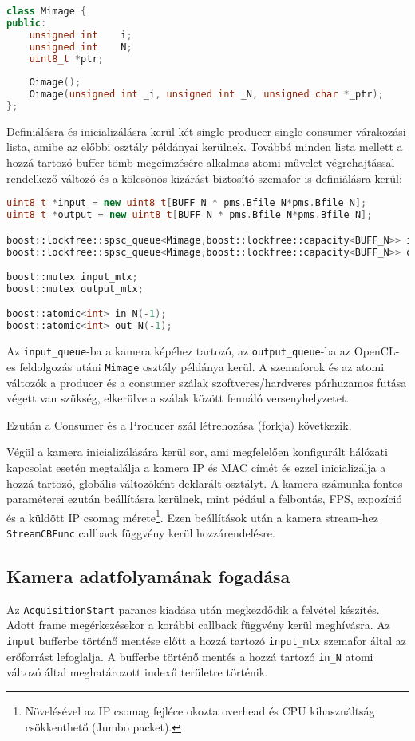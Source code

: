 \begin{lstlisting}[language=C++]
class Mimage {
public:
	unsigned int	i;
	unsigned int	N;
	uint8_t	*ptr;
	
	Oimage();
	Oimage(unsigned int _i, unsigned int _N, unsigned char *_ptr);
};
\end{lstlisting}

\noindent Definiálásra és inicializálásra kerül két single-producer single-consumer várakozási lista, amibe az előbbi osztály
példányai kerülnek. Továbbá minden lista mellett a hozzá tartozó buffer tömb megcímzésére alkalmas atomi művelet végrehajtással
rendelkező változó és a kölcsönös kizárást biztosító szemafor is definiálásra kerül:

\begin{lstlisting}[language=C++]
uint8_t *input = new uint8_t[BUFF_N * pms.Bfile_N*pms.Bfile_N];
uint8_t *output = new uint8_t[BUFF_N * pms.Bfile_N*pms.Bfile_N];

boost::lockfree::spsc_queue<Mimage,boost::lockfree::capacity<BUFF_N>> input_queue;
boost::lockfree::spsc_queue<Mimage,boost::lockfree::capacity<BUFF_N>> output_queue;

boost::mutex input_mtx;
boost::mutex output_mtx;

boost::atomic<int> in_N(-1);
boost::atomic<int> out_N(-1);
\end{lstlisting}

\noindent Az \texttt{input\_queue}-ba a kamera képéhez tartozó, az \texttt{output\_queue}-ba az OpenCL-es feldolgozás utáni
	\texttt{Mimage} osztály példánya kerül. A szemaforok és az atomi változók a producer és a consumer szálak szoftveres/hardveres
	párhuzamos futása végett van szükség, elkerülve a szálak között fennáló versenyhelyzetet.

	Ezután a Consumer és a Producer szál létrehozása (forkja) következik.
	
	Végül a kamera inicializálására kerül sor, ami megfelelően konfigurált hálózati kapcsolat esetén megtalálja a kamera IP és MAC
	címét és ezzel inicializálja a hozzá tartozó, globális változóként deklarált osztályt. A kamera számunka fontos paraméterei ezután
	beállításra kerülnek, mint pédául a felbontás, FPS, expozíció és a küldött IP csomag mérete\footnote{Növelésével az IP csomag
	fejléce okozta overhead és CPU kihasználtság csökkenthető (Jumbo packet).}.
	Ezen beállítások után a kamera stream-hez \texttt{StreamCBFunc} callback függvény kerül hozzárendelésre. 
	 
	\subsection*{Kamera adatfolyamának fogadása}
	Az \texttt{AcquisitionStart} parancs kiadása után megkezdődik a felvétel készítés. Adott frame megérkezésekor a korábbi callback
	függvény kerül meghívásra. Az \texttt{input} bufferbe történő mentése előtt a hozzá tartozó \texttt{input\_mtx}
	szemafor által az erőforrást lefoglalja. A bufferbe történő mentés a hozzá tartozó \texttt{in\_N} atomi változó által
	meghatározott indexű területre történik.
	
